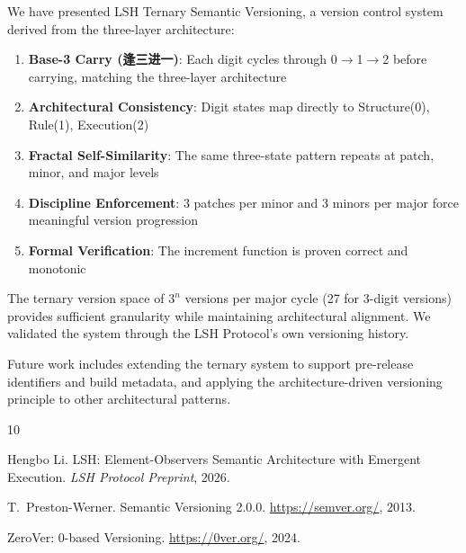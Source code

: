 \documentclass{article}
\begin{document}
We have presented LSH Ternary Semantic Versioning, a version control system derived from the three-layer architecture:

\begin{enumerate}
\item \textbf{Base-3 Carry (\textbf{逢三进一})}: Each digit cycles through 0$\to$1$\to$2 before carrying, matching the three-layer architecture
\item \textbf{Architectural Consistency}: Digit states map directly to Structure(0), Rule(1), Execution(2)
\item \textbf{Fractal Self-Similarity}: The same three-state pattern repeats at patch, minor, and major levels
\item \textbf{Discipline Enforcement}: 3 patches per minor and 3 minors per major force meaningful version progression
\item \textbf{Formal Verification}: The increment function is proven correct and monotonic
\end{enumerate}

The ternary version space of $3^n$ versions per major cycle (27 for 3-digit versions) provides sufficient granularity while maintaining architectural alignment. We validated the system through the LSH Protocol's own versioning history.

Future work includes extending the ternary system to support pre-release identifiers and build metadata, and applying the architecture-driven versioning principle to other architectural patterns.


\begin{thebibliography}{10}

Hengbo Li.
\newblock LSH: Element-Observers Semantic Architecture with Emergent Execution.
\newblock \emph{LSH Protocol Preprint}, 2026.

T.~Preston-Werner.
\newblock Semantic Versioning 2.0.0.
\newblock \url{https://semver.org/}, 2013.

ZeroVer: 0-based Versioning.
\newblock \url{https://0ver.org/}, 2024.

\end{thebibliography}
\end{document}
